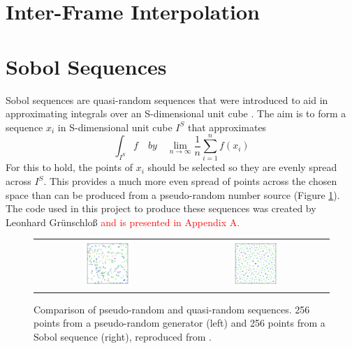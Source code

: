 \section{Inter-Frame Interpolation}

\section{Sobol Sequences}

Sobol sequences are quasi-random sequences that were introduced to aid in approximating integrals over an S-dimensional unit cube \cite{joe2008constructing}. The aim is to form a sequence $x_i$ in S-dimensional unit cube $I^S$ that approximates
\begin{equation}
    \int_{I^S} f \quad by \quad \lim_{n\to\infty}\frac{1}{n}\sum_{i=1}^{n} f(x_i)
\end{equation}
For this to hold, the points of $x_i$ should be selected so they are evenly spread across $I^S$. This provides a much more even spread of points across the chosen space than can be produced from a pseudo-random number source (Figure \ref{fig:Sobol}). The code used in this project to produce these sequences was created by Leonhard Gr\"unschlo\ss\space \cite{CodeSource} \textcolor{red}{and is presented in Appendix A.}

\begin{figure}[H]
    \begin{center}
    \begin{tabular}{ c c }
        \includegraphics[width=0.33\textwidth]{Figures/Pseudorandom_sequence_2D.png} &
        \includegraphics[width=0.33\textwidth]{Figures/Sobol_sequence_2D.png}
    \end{tabular}
    \caption[Comparison of pseudo-random and quasi-random sequences]{Comparison of pseudo-random and quasi-random sequences. 256 points from a pseudo-random generator (left) and 256 points from a Sobol sequence (right), reproduced from \cite{SobolWiki}.}
    \label{fig:Sobol}
    \end{center}
\end{figure}

